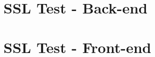 \begin{apendicesenv}
\chapter{SSL Test - Back-end}
\label{ssltest-backend}




\chapter{SSL Test - Front-end}
\label{ssltest-frontend}



\end{apendicesenv}
